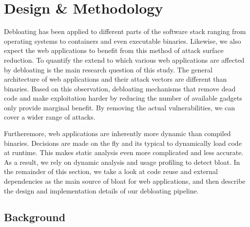 
\chapter{Design \& Methodology\label{ch:usage}}
Debloating has been applied to different parts of the software stack ranging from operating systems to containers and even executable binaries. Likewise, we also expect the web applications to benefit from this method of attack surface reduction.
To quantify the extend to which various web applications are affected by debloating is the main research question of this study. The general architecture of web applications and their attack vectors are different than binaries.
Based on this observation, debloating mechanisms that remove dead code and make exploitation harder by reducing the number of available gadgets only provide marginal benefit. By removing the actual vulnerabilities, we can cover a wider range of attacks.

Furtheremore, web applications are inherently more dynamic than compiled binaries. Decisions are made on the fly and its typical to dynamically load code at runtime. This makes static analysis even more complicated and less accurate. As a result, we rely on dynamic analysis and usage profiling to detect bloat. In the remainder of this section, we take a look at code reuse and external dependencies as the main source of bloat for web applications, and then describe the design and implementation details of our debloating pipeline.
\section{Background}



